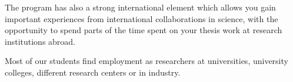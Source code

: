 \documentclass[%
twoside,                 %
final,                   %
10pt]{article}
\begin{document}
The program has also a strong international element which allows you
gain important experiences from international collaborations in
science, with the opportunity to spend parts of the time spent on your
thesis work at research institutions abroad.

Most of our students find employment as researchers at universities,
university colleges, different research centers or in industry.







\printindex
\end{document}
